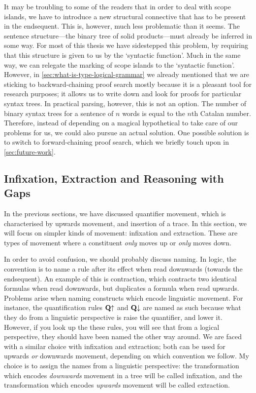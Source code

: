 It may be troubling to some of the readers that in order to deal with
scope islands, we have to introduce a new structural connective that
has to be present in the endsequent.
This is, however, much less problematic than it seems. The sentence
structure---the binary tree of solid products---must already be
inferred in some way. For most of this thesis we have sidestepped this
problem, by requiring that this structure is given to us by the
`syntactic function'. Much in the same way, we can relegate the
marking of scope islands to the `syntactic function'.
However, in \autoref{sec:what-is-type-logical-grammar} we already
mentioned that we are sticking to backward-chaining proof search
mostly because it is a pleasant tool for research purposes; it allows
us to write down and look for proofs for particular syntax trees. In
practical parsing, however, this is not an option. The number of
binary syntax trees for a sentence of $n$ words is equal to the $n$th
Catalan number.
Therefore, instead of depending on a magical hypothetical to take care
of our problems for us, we could also pursue an actual solution. One
possible solution is to switch to forward-chaining proof search, which
we briefly touch upon in \autoref{sec:future-work}.

\subsection{Infixation, Extraction and Reasoning with Gaps}
In the previous sections, we have discussed quantifier movement, which
is characterised by upwards movement, and insertion of a trace. In
this section, we will focus on simpler kinds of movement: infixation
and extraction. These are types of movement where a constituent
\emph{only} moves up or \emph{only} moves down.

In order to avoid confusion, we should probably discuss naming. In
logic, the convention is to name a rule after its effect when read
downwards (towards the endsequent). An example of this is contraction,
which contracts two identical formulas when read downwards, but
duplicates a formula when read upwards.
Problems arise when naming constructs which encode linguistic
movement. For instance, the quantification rules $\mathbf{Q}{\uparrow}$ and $\mathbf{Q}{\downarrow}$
are named as such because what they do from a linguistic perspective
is raise the quantifier, and lower it. However, if you look up the
these rules, you will see that from a logical perspective, they should
have been named the other way around.
We are faced with a similar choice with infixation and extraction;
both can be used for upwards \emph{or} downwards movement, depending
on which convention we follow. My choice is to assign the names from a
linguistic perspective: the transformation which encodes
\emph{downwards} movement in a tree will be called infixation, and the
transformation which encodes \emph{upwards} movement will be called
extraction.


